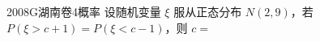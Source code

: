 
\begin{problem}{2008}{G}{湖南卷}{4}{概率}
设随机变量 $\xi$ 服从正态分布 $N(2,9)$，若 $P(\xi>c+1)=P(\xi<c-1)$，则 $c=$
\begin{choices}
\end{choices}
\end{problem}

\begin{answer}

\end{answer}

\begin{solutions}

\end{solutions}